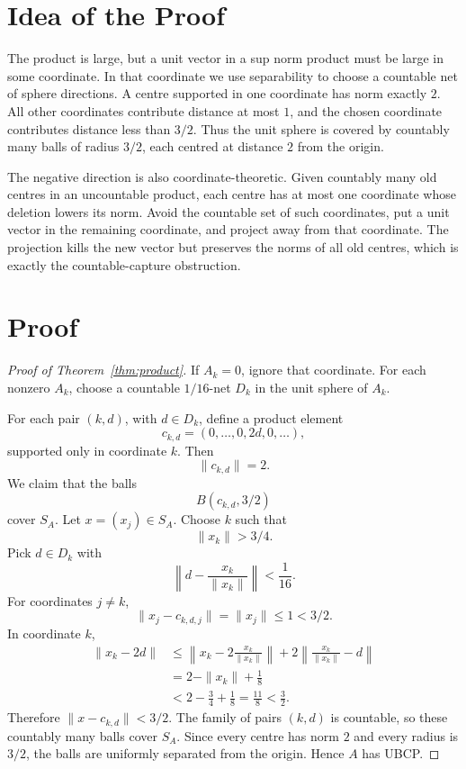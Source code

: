 \documentclass[11pt]{article}
\begin{document}
\section*{Idea of the Proof}

The product is large, but a unit vector in a sup norm product must be large in
some coordinate.  In that coordinate we use separability to choose a countable
net of sphere directions.  A centre supported in one coordinate has norm
exactly \(2\).  All other coordinates contribute distance at most \(1\), and
the chosen coordinate contributes distance less than \(3/2\).  Thus the unit
sphere is covered by countably many balls of radius \(3/2\), each centred at
distance \(2\) from the origin.

The negative direction is also coordinate-theoretic.  Given countably many
old centres in an uncountable product, each centre has at most one coordinate
whose deletion lowers its norm.  Avoid the countable set of such coordinates,
put a unit vector in the remaining coordinate, and project away from that
coordinate.  The projection kills the new vector but preserves the norms of
all old centres, which is exactly the countable-capture obstruction.

\section*{Proof}

\begin{proof}[Proof of Theorem~\ref{thm:product}]
If \(A_k=0\), ignore that coordinate.  For each nonzero \(A_k\), choose a
countable \(1/16\)-net \(D_k\) in the unit sphere of \(A_k\).

For each pair \((k,d)\), with \(d\in D_k\), define a product element
\[
        c_{k,d}=(0,\ldots,0,2d,0,\ldots),
\]
supported only in coordinate \(k\).  Then
\[
        \|c_{k,d}\|=2.
\]
We claim that the balls
\[
        B(c_{k,d},3/2)
\]
cover \(S_A\).  Let \(x=(x_j)\in S_A\).  Choose \(k\) such that
\[
        \|x_k\|>3/4.
\]
Pick \(d\in D_k\) with
\[
        \left\|d-\frac{x_k}{\|x_k\|}\right\|<\frac1{16}.
\]
For coordinates \(j\ne k\),
\[
        \|x_j-c_{k,d,j}\|=\|x_j\|\le1<3/2.
\]
In coordinate \(k\),
\[
\begin{aligned}
        \|x_k-2d\|
        &\le
        \left\|x_k-2\frac{x_k}{\|x_k\|}\right\|
        +2\left\|\frac{x_k}{\|x_k\|}-d\right\|\\
        &=
        2-\|x_k\|+\frac18\\
        &<
        2-\frac34+\frac18
        =
        \frac{11}{8}
        <
        \frac32.
\end{aligned}
\]
Therefore \(\|x-c_{k,d}\|<3/2\).  The family of pairs \((k,d)\) is
countable, so these countably many balls cover \(S_A\).  Since every centre
has norm \(2\) and every radius is \(3/2\), the balls are uniformly separated
from the origin.  Hence \(A\) has UBCP.
\end{proof}
\end{document}

